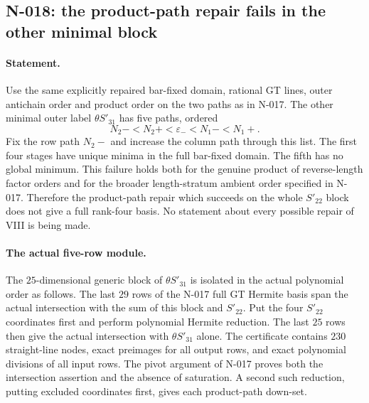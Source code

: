 \subsection{N-018: the product-path repair fails in the other minimal block}
\label{sec:nonstandard-second-block-failure}

\paragraph{Statement.}
Use the same explicitly repaired bar-fixed domain, rational GT lines,
outer antichain order and product order on the two paths as in N-017.
The other minimal outer label $\theta S'_{31}$ has five paths, ordered
\[
 N_2-<N_2+<\varepsilon_-<N_1-<N_1+.
\]
Fix the row path $N_2-$ and increase the column path through this list.
The first four stages have unique minima in the full bar-fixed domain.
The fifth has no global minimum.  This failure holds both for the
genuine product of reverse-length factor orders and for the broader
length-stratum ambient order specified in N-017.  Therefore the
product-path repair which succeeds on the whole $S'_{22}$ block does
not give a full rank-four basis.  No statement about every possible
repair of VIII is being made.

\paragraph{The actual five-row module.}
The $25$-dimensional generic block of $\theta S'_{31}$ is isolated in
the actual polynomial order as follows.  The last $29$ rows of the
N-017 full GT Hermite basis span the actual intersection with the sum
of this block and $S'_{22}$.  Put the four $S'_{22}$ coordinates first
and perform polynomial Hermite reduction.  The last $25$ rows then
give the actual intersection with $\theta S'_{31}$ alone.  The
certificate contains $230$ straight-line nodes, exact preimages for
all output rows, and exact polynomial divisions of all input rows.
The pivot argument of N-017 proves both the intersection assertion
and the absence of saturation.  A second such reduction, putting
excluded coordinates first, gives each product-path down-set.

